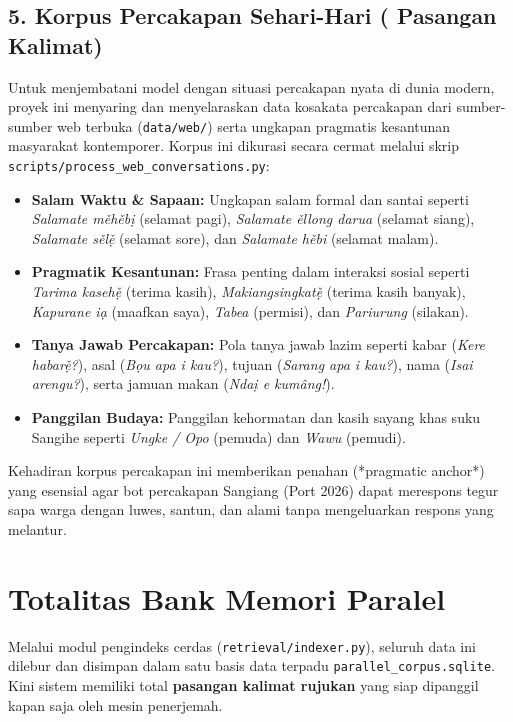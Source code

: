 \subsection{5. Korpus Percakapan Sehari-Hari (\StatCorpusPercakapan{} Pasangan Kalimat)}
Untuk menjembatani model dengan situasi percakapan nyata di dunia modern, proyek ini menyaring dan menyelaraskan data kosakata percakapan dari sumber-sumber web terbuka (\texttt{data/web/}) serta ungkapan pragmatis kesantunan masyarakat kontemporer. Korpus ini dikurasi secara cermat melalui skrip \texttt{scripts/process\_web\_conversations.py}:
\begin{itemize}
    \item \textbf{Salam Waktu \& Sapaan:} Ungkapan salam formal dan santai seperti \textit{Salamate měhěbị} (selamat pagi), \textit{Salamate ěllong darua} (selamat siang), \textit{Salamate sělẹ̌} (selamat sore), dan \textit{Salamate hěbi} (selamat malam).
    \item \textbf{Pragmatik Kesantunan:} Frasa penting dalam interaksi sosial seperti \textit{Tarima kasehẹ̌} (terima kasih), \textit{Makiangsingkatẹ̌} (terima kasih banyak), \textit{Kapurane iạ} (maafkan saya), \textit{Tabea} (permisi), dan \textit{Pariurung} (silakan).
    \item \textbf{Tanya Jawab Percakapan:} Pola tanya jawab lazim seperti kabar (\textit{Kere habarẹ̌?}), asal (\textit{Bọu apa i kau?}), tujuan (\textit{Sarang apa i kau?}), nama (\textit{Isai arengu?}), serta jamuan makan (\textit{Ndaị e kumâng!}).
    \item \textbf{Panggilan Budaya:} Panggilan kehormatan dan kasih sayang khas suku Sangihe seperti \textit{Ungke / Opo} (pemuda) dan \textit{Wawu} (pemudi).
\end{itemize}
Kehadiran korpus percakapan ini memberikan penahan (*pragmatic anchor*) yang esensial agar bot percakapan Sangiang (Port 2026) dapat merespons tegur sapa warga dengan luwes, santun, dan alami tanpa mengeluarkan respons yang melantur.

\section{Totalitas Bank Memori Paralel}
Melalui modul pengindeks cerdas (\texttt{retrieval/indexer.py}), seluruh data ini dilebur dan disimpan dalam satu basis data terpadu \texttt{parallel\_corpus.sqlite}. Kini sistem memiliki total \textbf{\StatCorpusTotal{} pasangan kalimat rujukan} yang siap dipanggil kapan saja oleh mesin penerjemah.
